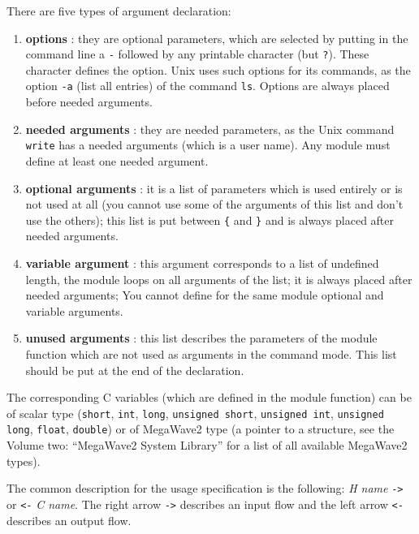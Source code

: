 There are five types of argument declaration:
\begin{enumerate}
\item {\bf options} : 
they are optional parameters, which are selected by
putting in the command line a \verb+-+ followed by any printable character
(but \verb+?+). These character defines the option.
Unix uses such options for its commands, as the option \verb+-a+ (list all entries) of the command \verb+ls+.
Options are always placed before needed arguments.

\item {\bf needed arguments } : they are needed parameters, as the Unix
command \verb+write+ has a needed arguments (which is a user name).
Any module must define at least one needed argument.

\item {\bf optional arguments} : it is a list of parameters which is used entirely or is not used at all (you cannot use some of the arguments of this list and don't use the others);
this list is put between \verb+{+ and \verb+}+ and is always placed after needed arguments.

\item {\bf variable argument} : this argument corresponds to a list of undefined length, the module loops on all arguments of the list;
 it is always placed after needed arguments;
You cannot define for the same module optional and variable arguments.

\item {\bf unused arguments} : this list describes the parameters of the module function which are not used as arguments in the command mode.
This list should be put at the end of the declaration.
\end{enumerate}

The corresponding C variables (which are defined in the module function) 
can be of scalar type (\verb+short+, \verb+int+, \verb+long+, \verb+unsigned short+, \verb+unsigned int+, \verb+unsigned long+, \verb+float+, \verb+double+) 
or of MegaWave2 type (a pointer to a structure, see the Volume two: ``MegaWave2 System Library'' for a list of all available MegaWave2 types).

The common description for the usage specification is the following: 
{\em H name} \verb+->+ or \verb+<-+ {\em C name}. 
The right arrow \verb+->+ describes an input flow and the left arrow
 \verb+<-+ describes an output flow. 

